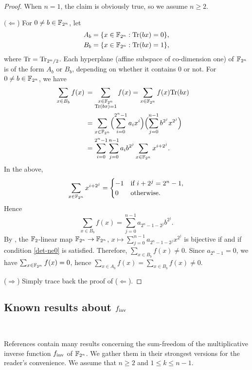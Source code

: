 \documentclass{amsart}
\numberwithin{equation}{section}
\theoremstyle{definition}
\newcommand{\f}{\Bbb F}
\newcommand{\tr}{\text{\rm Tr}}
\newcommand{\fin}{f_{\text{\rm inv}}}
\begin{document}
\begin{proof}
When $n=1$, the claim is obviously true, so we assume $n\ge 2$.
\medskip

$(\Leftarrow$) For $0\ne b\in \f_{2^n}$, let
\begin{gather*}
A_b=\{x\in\f_{2^n}:\tr(bx)=0\},\cr
B_b=\{x\in\f_{2^n}:\tr(bx)=1\},
\end{gather*}
where $\tr=\tr_{2^n/2}$. Each hyperplane (affine subspace of co-dimension one) of $\f_{2^n}$ is of the form $A_b$ or $B_b$, depending on whether it contains 0 or not. 
For $0\ne b\in\f_{2^n}$, we have
\begin{align*}
\sum_{x\in B_b}f(x)\,&=\sum_{\substack{x\in\f_{2^n}\cr \tr(bx)=1}}f(x)=\sum_{x\in\f_{2^n}}f(x)\tr(bx)\cr
&=\sum_{x\in\f_{2^n}}\Bigl(\sum_{i=0}^{2^n-1}a_ix^i\Big)\Bigl(\sum_{j=0}^{n-1}b^{2^j}x^{2^j}\Bigr)\cr
&=\sum_{i=0}^{2^n-1}\sum_{j=0}^{n-1}a_ib^{2^j}\sum_{x\in\f_{2^n}}x^{i+2^j}.
\end{align*}
In the above,
\[
\sum_{x\in\f_{2^n}}x^{i+2^j}=
\begin{cases}
-1&\text{if}\ i+2^j=2^n-1,\cr
0&\text{otherwise}.
\end{cases}
\]
Hence
\[
\sum_{x\in B_b}f(x)=\sum_{j=0}^{n-1}a_{2^n-1-2^j}b^{2^j}.
\]
By \cite[Theorem~2.29]{Hou-ams-gsm-2018}, the $\f_2$-linear map $\f_{2^n}\to\f_{2^n}$, $x\mapsto\sum_{j=0}^{n-1}a_{2^n-1-2^j}x^{2^j}$ is bijective if and if condition \eqref{det-ne0} is satisfied. Therefore, $\sum_{x\in B_b}f(x)\ne 0$. Since $a_{2^n-1}=0$, we have $\sum_{x\in\f_{2^n}}f(x)=0$, hence $\sum_{x\in A_b}f(x)=\sum_{x\in B_b}f(x)\ne0$.

\medskip
($\Rightarrow$) Simply trace back the proof of ($\Leftarrow$).
\end{proof}

\subsection{Known results about $\fin$}\

References \cite{Carlet-0,Carlet-pre,Carlet-Hou} contain many results concerning the sum-freedom of the multiplicative inverse function $\fin$ of $\f_{2^n}$. We gather them in their strongest versions for the reader's convenience. We assume that $n\ge 2$ and $1\le k\le n-1$.
\end{document}
